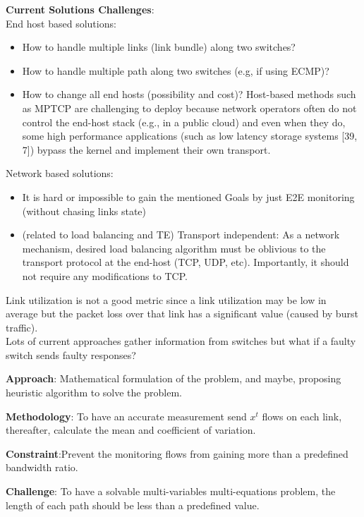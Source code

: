 \documentclass[10pt, journal, letterpaper]{IEEEtran}
\begin{document}
\noindent \textbf{Current Solutions Challenges}:\\
End host based solutions:
\begin{itemize}
    \item How to handle multiple links (link bundle) along two switches?
    \item How to handle multiple path along two switches (e.g, if using ECMP)?
    \item How to change all end hosts (possibility and cost)? Host-based methods such as MPTCP are challenging to deploy because network operators often do not control the end-host stack (e.g., in a public cloud) and even when they do, some high performance applications (such as low latency storage systems [39, 7]) bypass the kernel and implement their own transport.
\end{itemize}
Network based solutions:\\
\begin{itemize}
    \item It is hard or impossible to gain the mentioned Goals by just E2E monitoring (without chasing links state)
    \item (related to load balancing and TE) Transport independent: As a network mechanism, desired load balancing algorithm must be oblivious to the transport protocol at the end-host (TCP, UDP, etc). Importantly, it should not require any modifications to TCP.
\end{itemize}
Link utilization is not a good metric since a link utilization may be low in average but the packet loss over that link has a significant value (caused by burst traffic).\\
Lots of current approaches gather information from switches but what if a faulty switch sends faulty responses?


\noindent \textbf{Approach}: Mathematical formulation of the problem, and maybe, proposing heuristic algorithm to solve the problem.

\noindent \textbf{Methodology}: To have an accurate measurement send $x^t$ flows on each link, thereafter, calculate the mean and coefficient of variation.

\noindent \textbf{Constraint}:Prevent the monitoring flows from gaining more than a predefined bandwidth ratio.

\noindent \textbf{Challenge}: To have a solvable multi-variables multi-equations problem, the length of each path should be less than a predefined value.\\
\end{document}
